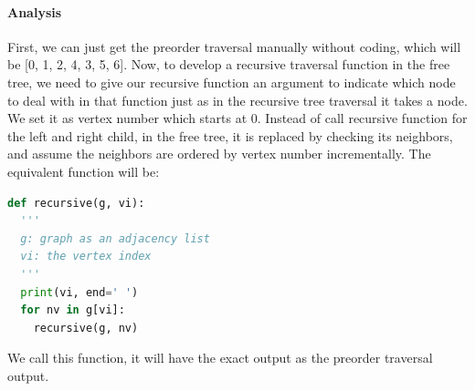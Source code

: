 \documentclass[main.tex]{subfiles}
\begin{document}
\paragraph{Analysis} First, we can just get the preorder traversal manually without coding, which will be [0, 1, 2, 4, 3, 5, 6]. Now, to develop a recursive traversal function in the free tree, we need to give our recursive function an argument to indicate which node to deal with in that function just as in the recursive tree traversal it takes a node. We set it as vertex number which starts at 0. Instead of call recursive function for the left and right child, in the free tree, it is replaced by checking its neighbors, and assume the neighbors are ordered by vertex number incrementally. The equivalent function will be:
\begin{lstlisting}[language=Python]
def recursive(g, vi):
  '''
  g: graph as an adjacency list
  vi: the vertex index
  '''
  print(vi, end=' ')
  for nv in g[vi]:   
    recursive(g, nv)
\end{lstlisting}
We call this function, it will have the exact output as the preorder traversal output.
\end{document}
